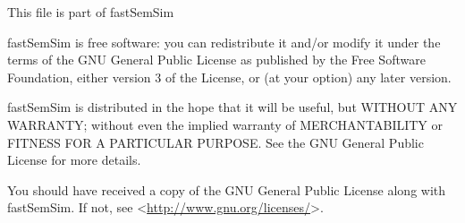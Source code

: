 \documentclass[letterpaper,10pt,english]{sphinxmanual}
\begin{document}
This file is part of fastSemSim

fastSemSim is free software: you can redistribute it and/or modify
it under the terms of the GNU General Public License as published by
the Free Software Foundation, either version 3 of the License, or
(at your option) any later version.

fastSemSim is distributed in the hope that it will be useful,
but WITHOUT ANY WARRANTY; without even the implied warranty of
MERCHANTABILITY or FITNESS FOR A PARTICULAR PURPOSE.  See the
GNU General Public License for more details.

You should have received a copy of the GNU General Public License
along with fastSemSim.  If not, see \textless{}\href{http://www.gnu.org/licenses/}{http://www.gnu.org/licenses/}\textgreater{}.
\end{document}
